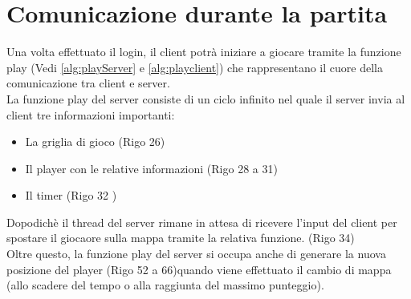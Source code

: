 \documentclass[a4paper]{article}
\begin{document}
\section{Comunicazione durante la partita}
Una volta effettuato il login, il client potrà iniziare a giocare tramite la funzione play (Vedi \autoref{alg:playServer} e \autoref{alg:playclient})
che rappresentano il cuore della comunicazione tra client e server.\\
La funzione play del server consiste di un ciclo infinito nel quale il server invia al client tre informazioni importanti:
\begin{itemize}
  \setlength\itemsep{0.2mm}
  \item La griglia di gioco (Rigo 26)
  \item Il player con le relative informazioni (Rigo 28 a 31)
  \item Il timer (Rigo 32 )
\end{itemize}
Dopodichè il thread del server rimane in attesa di ricevere l'input del client per spostare il giocaore sulla mappa tramite la relativa funzione. (Rigo 34)
\\Oltre questo, la funzione play del server si occupa anche di generare la nuova posizione del player (Rigo 52 a 66)quando viene effettuato il cambio di mappa (allo scadere del tempo o alla raggiunta del massimo punteggio).
\pagebreak
\end{document}
